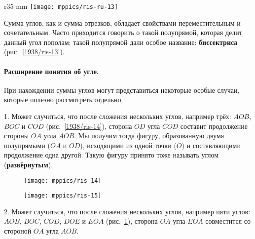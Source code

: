 \begin{wrapfigure}{r}{35 mm}
\vskip-4mm
\centering
\texttt{[image: mppics/ris-ru-13]}
\caption{}\label{1938/ris-13}
\vskip-4mm
\end{wrapfigure}


Сумма углов, как и сумма отрезков, обладает свойствами переместительным и сочетательным.
Часто приходится говорить о такой полупрямой, которая делит данный угол пополам;
такой полупрямой дали особое название:
\textbf{биссектриса} (рис.~\ref{1938/ris-13}).


\paragraph{Расширение понятия об угле.}\label{1938/16}
При нахождении суммы углов могут представиться некоторые особые случаи, которые полезно рассмотреть отдельно.

1.
Может случиться, что после сложения нескольких углов, например трёх:
$AOB$, $BOC$ и $COD$ (рис.~\ref{1938/ris-14}), сторона $OD$ угла $COD$ составит продолжение стороны $OA$ угла $AOB$.
Мы получим тогда фигуру, образованную двумя полупрямыми ($OA$ и $OD$), исходящими из одной точки ($O$) и составляющими продолжение одна другой.
Такую фигуру принято тоже называть углом (\textbf{развёрнутым}).

\begin{figure}[!ht]
\begin{minipage}{.48\textwidth}
\centering
\texttt{[image: mppics/ris-14]}
\end{minipage}\hfill
\begin{minipage}{.48\textwidth}
\centering
\texttt{[image: mppics/ris-15]}
\end{minipage}

\medskip

\begin{minipage}{.48\textwidth}
\centering
\caption{}\label{1938/ris-14}
\end{minipage}\hfill
\begin{minipage}{.48\textwidth}
\centering
\caption{}\label{1938/ris-15}
\end{minipage}
\vskip-4mm
\end{figure}

2.
Может случиться, что после сложения нескольких углов, например пяти углов:
$AOB$, $BOC$, $COD$, $DOE$ и $EOA$ (рис.~\ref{1938/ris-15}), сторона $OA$ угла $EOA$ совместится со стороной $OA$ угла $AOB$.

